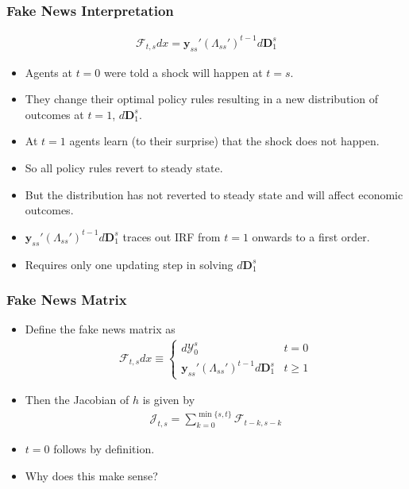 \documentclass[english,xcolor=svgnames]{beamer}
\begin{document}
\begin{frame}
    \frametitle{Fake News Interpretation}
     \begin{align*}
        	\mathcal{F}_{t,s}dx = \bm{y}_{ss}' (\Lambda_{ss}')^{t-1}d\bm{D}_1^s
        \end{align*}
    \begin{itemize}
        \item Agents at $t=0$ were told a shock will happen at $t=s$.
        \item They change their optimal policy rules resulting in a new distribution of outcomes at $t=1$, $d\bm{D}_1^s$.
        \item At $t=1$ agents learn (to their surprise) that the shock does not happen.
        \item So all policy rules revert to steady state.
        \item But the distribution has not reverted to steady state and will affect economic outcomes.
        \item $\bm{y}_{ss}' (\Lambda_{ss}')^{t-1}d\bm{D}_1^s$ traces out IRF from $t=1$ onwards to a first order.
        \item Requires only one updating step in solving $d\bm{D}_1^s$
	\end{itemize}
\end{frame}


\begin{frame}
    \frametitle{Fake News Matrix}
    \begin{itemize}
    	\item Define the fake news matrix as
    	\begin{align*}
    		\mathcal{F}_{t,s}dx \equiv \begin{cases}
    			d\mathcal{Y}_0^s & t=0 \\
    			\bm{y}_{ss}' (\Lambda_{ss}')^{t-1}d\bm{D}_1^s & t\ge 1
    		\end{cases}
    	\end{align*}
        \item Then the Jacobian of $h$ is given by
        \begin{align*}
        	\mathcal{J}_{t,s} = \sum_{k=0}^{\min\{s,t\}}\mathcal{F}_{t-k,s-k}
        \end{align*}
        \item $t=0$ follows by definition.
        \item Why does this make sense?
	\end{itemize}
\end{frame}
\end{document}
